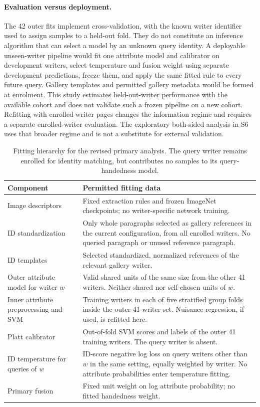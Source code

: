 \documentclass[10pt,a4paper]{article}
\begin{document}
\paragraph{Evaluation versus deployment.} The 42 outer fits implement cross-validation, with the known writer identifier used to assign samples to a held-out fold. They do not constitute an inference algorithm that can select a model by an unknown query identity. A deployable unseen-writer pipeline would fit one attribute model and calibrator on development writers, select temperature and fusion weight using separate development predictions, freeze them, and apply the same fitted rule to every future query. Gallery templates and permitted gallery metadata would be formed at enrolment. This study estimates held-out-writer performance with the available cohort and does not validate such a frozen pipeline on a new cohort. Refitting with enrolled-writer pages changes the information regime and requires a separate enrolled-writer evaluation. The exploratory both-sided analysis in S6 uses that broader regime and is not a substitute for external validation.

\begin{table}[ht]
\caption{Fitting hierarchy for the revised primary analysis. The query writer remains enrolled for identity matching, but contributes no samples to its query-handedness model.}\label{tab:nesting}
\centering\small
\begin{tabularx}{\textwidth}{p{}X}\toprule
Component & Permitted fitting data\\\midrule
Image descriptors & Fixed extraction rules and frozen ImageNet checkpoints; no writer-specific network training.\\
ID standardization & Only whole paragraphs selected as gallery references in the current configuration, from all enrolled writers. No queried paragraph or unused reference paragraph.\\
ID templates & Selected standardized, normalized references of the relevant gallery writer.\\
Outer attribute model for writer $w$ & Valid shared units of the same size from the other 41 writers. Neither shared nor self-chosen units of $w$.\\
Inner attribute preprocessing and SVM & Training writers in each of five stratified group folds inside the outer 41-writer set. Nuisance regression, if used, is refitted here.\\
Platt calibrator & Out-of-fold SVM scores and labels of the outer 41 training writers. The query writer is absent.\\
ID temperature for queries of $w$ & ID-score negative log loss on query writers other than $w$ in the same setting, equally weighted by writer. No attribute probabilities enter temperature fitting.\\
Primary fusion & Fixed unit weight on log attribute probability; no fitted handedness weight.\\\bottomrule
\end{tabularx}
\end{table}
\end{document}
